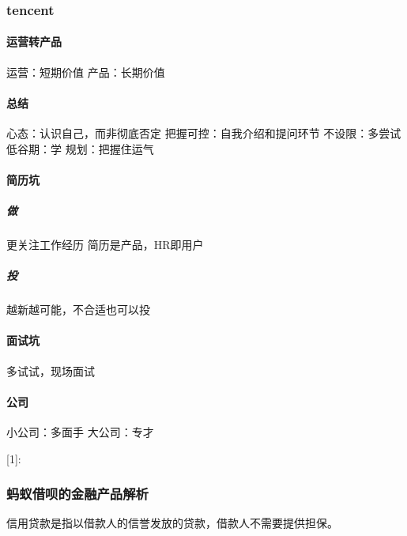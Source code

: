 \documentclass[letterpaper,10pt,english]{sphinxmanual}
\begin{document}
\subsubsection{tencent}
\label{\detokenize{chapter_experience/tencent:tencent}}\label{\detokenize{chapter_experience/tencent::doc}}

\paragraph{运营转产品}
\label{\detokenize{chapter_experience/tencent:id1}}
运营：短期价值 产品：长期价值


\paragraph{总结}
\label{\detokenize{chapter_experience/tencent:id2}}
心态：认识自己，而非彻底否定 把握可控：自我介绍和提问环节 不设限：多尝试
低谷期：学 规划：把握住运气


\paragraph{简历坑}
\label{\detokenize{chapter_experience/tencent:id3}}

\subparagraph{做}
\label{\detokenize{chapter_experience/tencent:id4}}
更关注工作经历 简历是产品，HR即用户


\subparagraph{投}
\label{\detokenize{chapter_experience/tencent:id5}}
越新越可能，不合适也可以投


\paragraph{面试坑}
\label{\detokenize{chapter_experience/tencent:id6}}
多试试，现场面试


\paragraph{公司}
\label{\detokenize{chapter_experience/tencent:id7}}
小公司：多面手 大公司：专才

{[}1{]}: %
\begin{footnote}[689]\sphinxAtStartFootnote
{}
%
\end{footnote}


\subsubsection{蚂蚁借呗的金融产品解析}
\label{\detokenize{chapter_experience/ant_jiebei:id1}}\label{\detokenize{chapter_experience/ant_jiebei::doc}}
信用贷款是指以借款人的信誉发放的贷款，借款人不需要提供担保。
\end{document}
